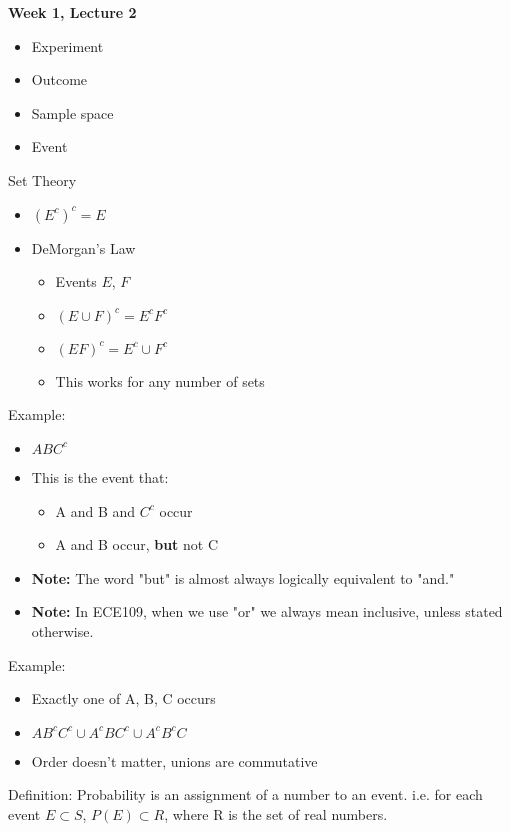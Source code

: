 \documentclass[10pt]{article}
\begin{document}
\begin{center}
	\Large \textbf{Week 1, Lecture 2}
\end{center}
\normalsize
\begin{itemize}
    \item Experiment
    \item Outcome
    \item Sample space
    \item Event
\end{itemize}
Set Theory 
\begin{itemize}
    \item $(E^c)^c = E$
    \item DeMorgan's Law
        \begin{itemize}
            \item Events $E$, $F$
            \item $(E \cup F)^c = E^cF^c$
            \item $(EF)^c = E^c \cup F^c$
            \item This works for any number of sets
        \end{itemize}
\end{itemize}
Example:
\begin{itemize}
    \item $ABC^c$
    \item This is the event that:
        \begin{itemize}
            \item A and B and $C^c$ occur
            \item A and B occur, \textbf{but} not C
        \end{itemize}
    \item \textbf{Note:} The word "but" is almost always logically equivalent to "and."
    \item \textbf{Note:} In ECE109, when we use "or" we always mean inclusive,
        unless stated otherwise.
\end{itemize}
Example:
\begin{itemize}
    \item Exactly one of A, B, C occurs
    \item $AB^cC^c \cup A^cBC^c \cup A^cB^cC$
    \item Order doesn't matter, unions are commutative
\end{itemize}

Definition: Probability is an assignment of a number to an event. i.e. for each
event $E \subset S$, $P(E) \subset R$, where R is the set of real numbers.
\end{document}
